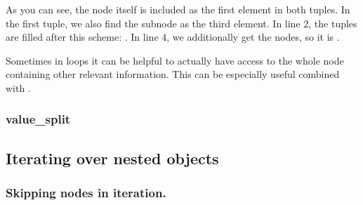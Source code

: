 \documentclass[a4paper,10pt,english]{sphinxmanual}
\begin{document}
\sphinxAtStartPar
As you can see, the node itself is included as the first element in both tuples. In the first tuple, we also find the subnode  as the third element. In line 2, the tuples are filled after this scheme: . In line 4, we additionally get the nodes, so it is .

\sphinxAtStartPar
Sometimes in loops it can be helpful to actually have access to the whole node containing other relevant information. This can be especially useful combined with {\hyperref[\detokenize{README:skipping-nodes-in-iteration}]{}}.


\subsubsection{value\_split}
\label{\detokenize{README:value-split}}

\subsection{Iterating over nested objects}
\label{\detokenize{README:iterating-over-nested-objects}}

\subsubsection{Skipping nodes in iteration.}
\label{\detokenize{README:skipping-nodes-in-iteration}}
\sphinxstepscope
\end{document}
